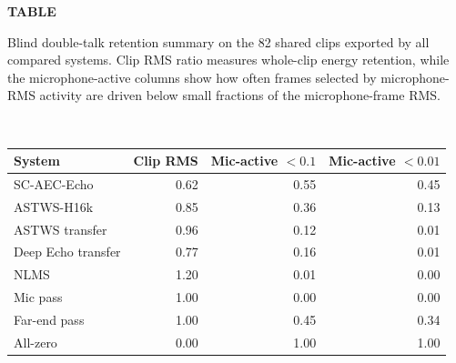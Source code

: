 \par\noindent
{}
\label{tab:blind-retention}
\begin{center}
\textbf{TABLE \thetable}\\
\parbox{0.96\linewidth}{\centering Blind double-talk retention summary on the 82 shared clips exported by all compared systems. Clip RMS ratio measures whole-clip energy retention, while the microphone-active columns show how often frames selected by microphone-RMS activity are driven below small fractions of the microphone-frame RMS.}\\[0.5ex]
\scriptsize
\begin{tabular}{lrrr}
\hline
System & Clip RMS & Mic-active $<0.1$ & Mic-active $<0.01$ \\
\hline
SC-AEC-Echo & 0.62 & 0.55 & 0.45 \\
ASTWS-H16k & 0.85 & 0.36 & 0.13 \\
ASTWS transfer & 0.96 & 0.12 & 0.01 \\
Deep Echo transfer & 0.77 & 0.16 & 0.01 \\
NLMS & 1.20 & 0.01 & 0.00 \\
Mic pass & 1.00 & 0.00 & 0.00 \\
Far-end pass & 1.00 & 0.45 & 0.34 \\
All-zero & 0.00 & 1.00 & 1.00 \\
\hline
\end{tabular}
\end{center}
\par\medskip
